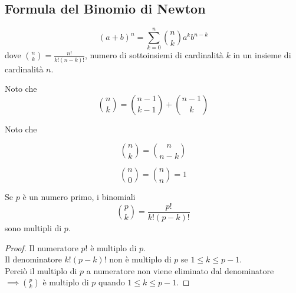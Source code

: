 \documentclass[a4paper,12pt, oneside]{book}
\begin{document}
		\subsection{Formula del Binomio di Newton}
			\begin{definizione}
				$$(a+b)^n = \sum_{k=0}^{n} \binom{n}{k} a^{k} b^{n-k}$$
				dove $\binom{n}{k} = \frac{n!}{k!(n-k)!}$, numero di sottoinsiemi di cardinalità $k$ in un insieme di cardinalità $n$.
			\end{definizione}
			\begin{nota}Noto che 
				$$\binom{n}{k} = \binom{n-1}{k-1} + \binom{n-1}{k}$$
			\end{nota}
			\begin{nota}
				Noto che \\
				
				\begin{minipage}{0.45\textwidth}
					$$\binom{n}{k} = \binom{n}{n-k}$$
				\end{minipage}%
				\hfill
				\begin{minipage}{0.45\textwidth}
					$$\binom{n}{0} = \binom{n}{n} = 1$$
				\end{minipage}%
				
			\end{nota}
			\begin{nota}
				Se $p$ è un numero primo, i binomiali $$\binom{p}{k} = \frac{p!}{k!(p-k)!}$$ sono multipli di $p$.
				\begin{proof}
					Il numeratore $p!$ è multiplo di $p$.\\
					Il denominatore $k!(p-k)!$ non è multiplo di $p$ se $1 \leq k \leq p-1$.\\
					Perciò il multiplo di $p$ a numeratore non viene eliminato dal denominatore
					$\implies \binom{p}{k}$ è multiplo di $p$ quando $1 \leq k \leq p-1$.  
				\end{proof}
			\end{nota}
			
\end{document}
